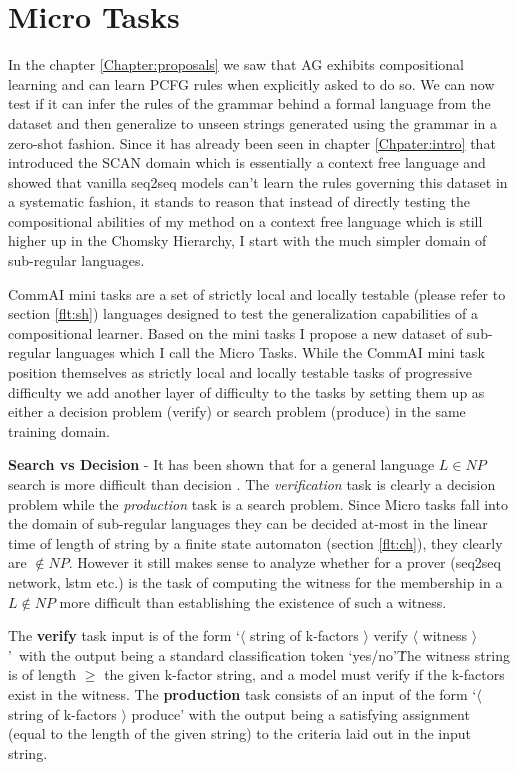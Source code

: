 \chapter{Micro Tasks}\label{Chapter:datasets}
In the chapter \ref{Chapter:proposals} we saw that AG exhibits compositional learning and can learn PCFG rules when explicitly asked to do so. We can now test if it can infer the rules of the grammar behind a formal language from the dataset and then generalize to unseen strings generated using the grammar in a zero-shot fashion. Since it has already been seen in chapter \ref{Chpater:intro} that \cite{Lake2017} introduced the SCAN domain which is essentially a context free language and showed that vanilla seq2seq models can't learn the rules governing this dataset in a systematic fashion, it stands to reason that instead of directly testing the compositional abilities of my method on a context free language which is still higher up in the Chomsky Hierarchy, I start with the much simpler domain of sub-regular languages.

CommAI mini tasks \citep{Baroni2017} are a set of strictly local and locally testable (please refer to section \ref{flt:sh}) languages designed to test the generalization capabilities of a compositional learner. Based on the mini tasks I propose a new dataset of sub-regular languages which I call the Micro Tasks. While the CommAI mini task position themselves as strictly local and locally testable tasks of progressive difficulty we add another layer of difficulty to the tasks by setting them up as either a decision problem (verify) or search problem (produce) in the same training domain.

\textbf{Search vs Decision} - It has been shown that for a general language $L \in NP$ search is more difficult than decision \cite{Bellare1994}. The \textit{verification} task is clearly a decision problem while the \textit{production} task is a search problem. Since Micro tasks fall into the domain of sub-regular languages they can be decided at-most in the linear time of length of string by a finite state automaton (section \ref{flt:ch}), they clearly are $\notin NP$. However it still makes sense to analyze whether for a prover (seq2seq network, lstm etc.) is the task of computing the witness for the membership in a $L \notin NP$ more difficult than establishing the existence of such a witness.

The \textbf{verify} task input is of the form \lq $\langle$ string of k-factors $\rangle$ verify $\langle$ witness $\rangle${}\rq\ with the output being a standard classification token \lq yes/no{}\rq\. The witness string is of length $\geq$ the given k-factor string, and a model must verify if the k-factors exist in the witness. The \textbf{production} task consists of an input of the form \lq $\langle$ string of k-factors $\rangle$ produce\rq{} with the output being a satisfying assignment (equal to the length of the given string) to the criteria laid out in the input string.


